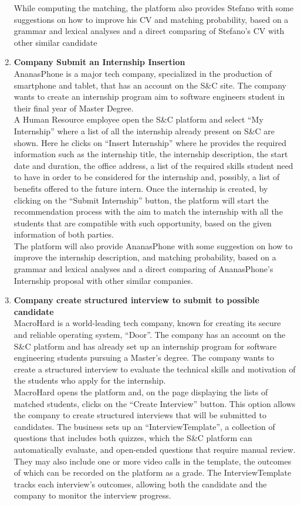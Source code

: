 \begin{enumerate}
        While computing the matching, the platform also provides Stefano with some suggestions on how to improve his CV and matching probability, based on a grammar and lexical analyses and a direct comparing of Stefano's CV with other similar candidate
    \item \textbf{\textcolor{titleColor}{Company Submit an Internship Insertion}}\\
        AnanasPhone is a major tech company, specialized in the production of smartphone and tablet, that has an account on the S\&C site. The company wants to create an internship program aim to software engineers student in their final year of Master Degree.\\
        A Human Resource employee open the S\&C platform and select “My Internship” where a list of all the internship already present on S\&C are shown. Here he clicks on “Insert Internship” where he provides the required information such as the internship title, the internship description, the start date and duration, the office address, a list of the required skills student need to have in order to be considered for the internship and, possibly, a list of benefits offered to the future intern. Once the internship is created, by clicking on the “Submit Internship” button, the platform will start the recommendation process with the aim to match the internship with all the students that are compatible with such opportunity, based on the given information of both parties.\\
        The platform will also provide AnanasPhone with some suggestion on how to improve the internship description, and matching probability, based on a grammar and lexical analyses and a direct comparing of AnanasPhone's Internship proposal with other similar companies.
    \item \textbf{\textcolor{titleColor}{Company create structured interview to submit to possible candidate}}\\
        MacroHard is a world-leading tech company, known for creating its secure and reliable operating system, “Door”. The company has an account on the S\&C platform and has already set up an internship program for software engineering students pursuing a Master’s degree. The company wants to create a structured interview to evaluate the technical skills and motivation of the students who apply for the internship.\\
        MacroHard opens the platform and, on the page displaying the lists of matched students, clicks on the “Create Interview” button. This option allows the company to create structured interviews that will be submitted to candidates. The business sets up an “InterviewTemplate”, a collection of questions that includes both quizzes, which the S\&C platform can automatically evaluate, and open-ended questions that require manual review. They may also include one or more video calls in the template, the outcomes of which can be recorded on the platform as a grade. The InterviewTemplate tracks each interview’s outcomes, allowing both the candidate and the company to monitor the interview progress.\\

\end{enumerate}

